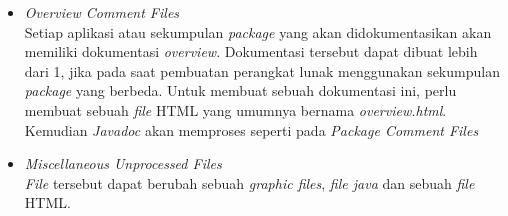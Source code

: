 \documentclass[a4paper,twoside]{article}
\begin{document}
\begin{enumerate}
\begin{enumerate}
\begin{itemize}
	\begin{lstlisting}[language=Java, caption={\it File} package-info.java, label={package-info}]
	/**
	 * Provides the classes necessary to create an applet
	 * and the classes an applet uses to communicate
	 * with its applet context.
	 *
	 * @since 1.0
	 * @see java.awt
	 */
	 package java.lang.applet;
	\end{lstlisting}
	Ketika {\it Javadoc} memproses {\it package} tersebut, {\it Javadoc} akan melakukan beberapa langkah yaitu sebagai berikut:
	\begin{enumerate}
		\item Menyalin informasi untuk diproses. Jika {\it file} berupa HTML maka pada bagian {\it <body>} hingga {\it </body>} akan disalin.
		\item Memproses semua {\it tag} pada {\it package} yang ada.
		\item Memasukan teks yang sudah diproses tersebut pada bagian bawah halaman dokumentasi yang dihasilkan.
		\item Salin kalimat pertama pada {\it package} tersebut pada bagian atas halaman dokumentasi
	\end{enumerate}
	\item {\it Overview Comment Files}\\
	Setiap aplikasi atau sekumpulan {\it package} yang akan didokumentasikan akan memiliki dokumentasi {\it overview}. Dokumentasi tersebut dapat dibuat lebih dari 1, jika pada saat pembuatan perangkat lunak menggunakan sekumpulan {\it package} yang berbeda. Untuk membuat sebuah dokumentasi ini, perlu membuat sebuah {\it file} HTML yang umumnya bernama {\it overview.html}. Kemudian {\it Javadoc} akan memproses seperti pada {\it Package Comment Files}
	\item {\it Miscellaneous Unprocessed Files}\\
	{\it File} tersebut dapat berubah sebuah {\it graphic files}, {\it file java} dan sebuah {\it file} HTML.
\end{itemize}


\end{enumerate}
\end{enumerate}
\end{document}
